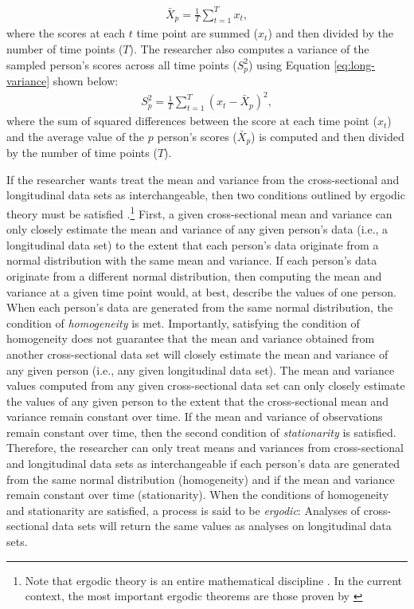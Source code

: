 \documentclass[
12pt, %
twoside,
english]{guelphthesis}
\begin{document}
\begin{align}
\bar{X}_p = \frac{1}{T}\sum^T_{t = 1} x_t,
\label{eq:long-mean}
\end{align}
\noindent where the scores at each \(t\) time point are summed (\(x_t\)) and then divided by the number of time points (\(T\)). The researcher also computes a variance of the sampled person's scores across all time points (\(S^2_p\)) using Equation \ref{eq:long-variance} shown below:
\begin{align}
S^2_p = \frac{1}{T}\sum^T_{t = 1} (x_t - \bar{X}_p)^2,
\label{eq:long-variance}
\end{align}
\noindent where the sum of squared differences between the score at each time point (\(x_t\)) and the average value of the \(p\) person's scores (\(\bar{X}_p\)) is computed and then divided by the number of time points (\(T\)).

If the researcher wants treat the mean and variance from the cross-sectional and longitudinal data sets as interchangeable, then two conditions outlined by ergodic theory must be satisfied \autocite{molenaar2004,molenaar2009}.\footnote{Note that ergodic theory is an entire mathematical discipline \parencite[for an introduction, see][]{petersen1983}. In the current context, the most important ergodic theorems are those proven by \citeauthor{birkhoff1931} } First, a given cross-sectional mean and variance can only closely estimate the mean and variance of any given person's data (i.e., a longitudinal data set) to the extent that each person's data originate from a normal distribution with the same mean and variance. If each person's data originate from a different normal distribution, then computing the mean and variance at a given time point would, at best, describe the values of one person. When each person's data are generated from the same normal distribution, the condition of \emph{homogeneity} is met. Importantly, satisfying the condition of homogeneity does not guarantee that the mean and variance obtained from another cross-sectional data set will closely estimate the mean and variance of any given person (i.e., any given longitudinal data set). The mean and variance values computed from any given cross-sectional data set can only closely estimate the values of any given person to the extent that the cross-sectional mean and variance remain constant over time. If the mean and variance of observations remain constant over time, then the second condition of \emph{stationarity} is satisfied. Therefore, the researcher can only treat means and variances from cross-sectional and longitudinal data sets as interchangeable if each person's data are generated from the same normal distribution (homogeneity) and if the mean and variance remain constant over time (stationarity). When the conditions of homogeneity and stationarity are satisfied, a process is said to be \emph{ergodic}: Analyses of cross-sectional data sets will return the same values as analyses on longitudinal data sets.
\end{document}
